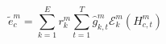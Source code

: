 \begin{equation}
\label{eq:direct-evidence}
{\widetilde{e}}_{c}^{m}=\sum _{k=1}^{E}{r}_{k}^{m}\sum _{t=1}^{T}{\widehat{g}}_{k,t}^{m}{\mathcal{E}}_{k}^{m}\left( {H}_{c,t}^{m}\right) 
\end{equation}
